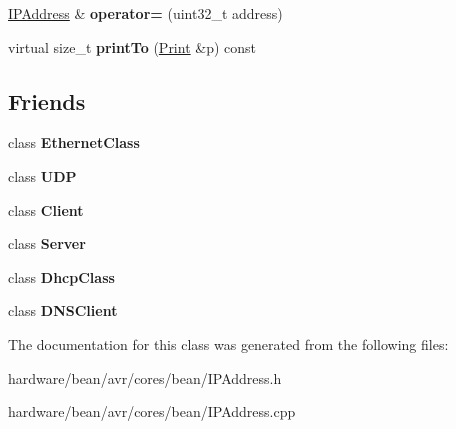 \begin{DoxyCompactItemize}
\item 
\hypertarget{class_i_p_address_af80a0f81dc5861ae3240a4331c5fc14c}{}\hyperlink{class_i_p_address}{I\+P\+Address} \& {\bfseries operator=} (uint32\+\_\+t address)\label{class_i_p_address_af80a0f81dc5861ae3240a4331c5fc14c}

\item 
\hypertarget{class_i_p_address_a2dd7f6c455c2f33e4639944f751930db}{}virtual size\+\_\+t {\bfseries print\+To} (\hyperlink{class_print}{Print} \&p) const \label{class_i_p_address_a2dd7f6c455c2f33e4639944f751930db}

\end{DoxyCompactItemize}
\subsection*{Friends}
\begin{DoxyCompactItemize}
\item 
\hypertarget{class_i_p_address_a9a150ffc237e50529b3d0d50cc83a4d7}{}class {\bfseries Ethernet\+Class}\label{class_i_p_address_a9a150ffc237e50529b3d0d50cc83a4d7}

\item 
\hypertarget{class_i_p_address_a480cf93423716d22666c9c3f17177736}{}class {\bfseries U\+D\+P}\label{class_i_p_address_a480cf93423716d22666c9c3f17177736}

\item 
\hypertarget{class_i_p_address_a5db1c99e2c94b26278f3838c85cdb618}{}class {\bfseries Client}\label{class_i_p_address_a5db1c99e2c94b26278f3838c85cdb618}

\item 
\hypertarget{class_i_p_address_ac2055578ac48afabe5af487878450f68}{}class {\bfseries Server}\label{class_i_p_address_ac2055578ac48afabe5af487878450f68}

\item 
\hypertarget{class_i_p_address_afef6ad9b691e32ea60d87db719e23e15}{}class {\bfseries Dhcp\+Class}\label{class_i_p_address_afef6ad9b691e32ea60d87db719e23e15}

\item 
\hypertarget{class_i_p_address_a14acdf960f52e4a43740d57e81a27c40}{}class {\bfseries D\+N\+S\+Client}\label{class_i_p_address_a14acdf960f52e4a43740d57e81a27c40}

\end{DoxyCompactItemize}


The documentation for this class was generated from the following files\+:\begin{DoxyCompactItemize}
\item 
hardware/bean/avr/cores/bean/I\+P\+Address.\+h\item 
hardware/bean/avr/cores/bean/I\+P\+Address.\+cpp\end{DoxyCompactItemize}
